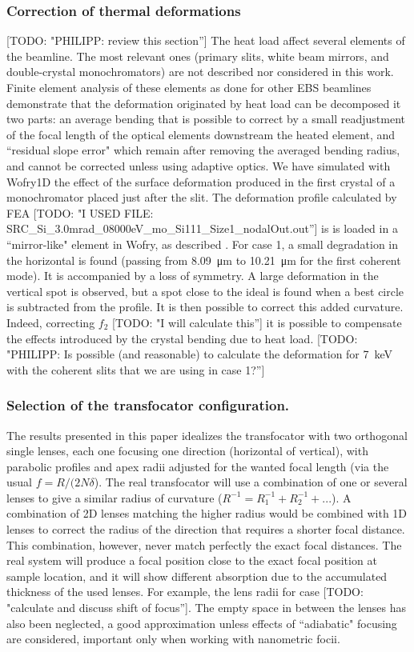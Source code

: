 \documentclass{iucr}              %
\newcommand{\todo}[1]{{\color{red}[TODO: "#1'']}}
\begin{document}
\subsubsection{Correction of thermal deformations}
\todo{PHILIPP: review this section}
The heat load affect several elements of the beamline. The most relevant ones (primary slits, white beam mirrors, and double-crystal monochromators) are not described nor considered in this work. Finite element analysis of these elements as done for other EBS beamlines \cite{Brumund} demonstrate that the deformation originated by heat load can be decomposed it two parts: an average bending that is possible to correct by a small readjustment of the focal length of the optical elements downstream the heated element, and ``residual slope error" which remain after removing the averaged bending radius, and cannot be corrected unless using adaptive optics. We have simulated with Wofry1D the effect of the surface deformation produced in the first crystal of a monochromator placed just after the slit. The deformation profile calculated by FEA \todo{I USED FILE: SRC\_Si\_3.0mrad\_08000eV\_mo\_Si111\_Size1\_nodalOut.out} is is loaded in a ``mirror-like" element in Wofry, as described \cite{srioLBL}. For case 1, a small degradation in the horizontal is found (passing from \SI{8.09}{\micro\meter} to \SI{10.21}{\micro\meter} for the first coherent mode). It is accompanied by a loss of symmetry. A large deformation in the vertical spot is observed, but a spot close to the ideal is found when a best circle is subtracted from the profile. It is then possible to correct this added curvature. Indeed, correcting $f_2$ \todo{I will calculate this} it is possible to compensate the effects introduced by the crystal bending due to heat load.
\todo{PHILIPP: Is possible (and reasonable) to calculate the deformation for \SI{7}{keV} with the coherent slits that we are using in case 1?}   

\subsubsection{Selection of the transfocator configuration.} 
The results presented in this paper idealizes the transfocator with two orthogonal single lenses, each one focusing one direction (horizontal of vertical), with parabolic profiles and apex radii adjusted for the wanted focal length (via the usual $f=R/(2 N \delta$). The real transfocator will use a combination of one or several lenses to give a similar radius of curvature  ($R^{-1} = R_1^{-1} + R_2^{-1} + ...$). A combination of 2D lenses matching the higher radius would be combined with 1D lenses to correct the radius of the direction that requires a shorter focal distance. This combination, however, never match perfectly the exact focal distances. The real system will produce a focal position close to the exact focal position at sample location, and it will show different absorption due to the accumulated thickness of the used lenses. For example, the lens radii for case \todo{calculate and discuss shift of focus}. The empty space in between the lenses has also been neglected, a good approximation unless effects of ``adiabatic" focusing are considered, important only when working with nanometric focii.    
\end{document}
